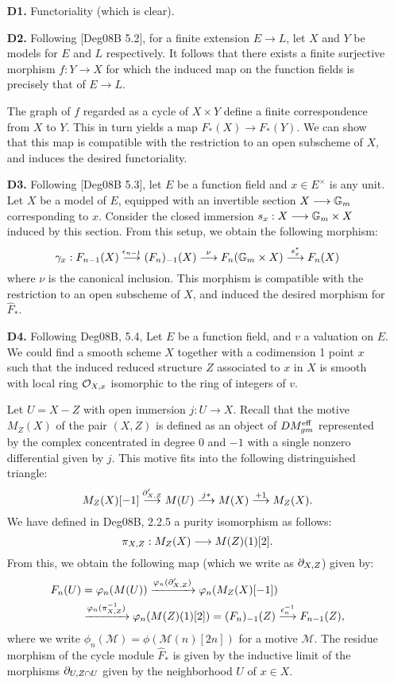 \begin{enumerate}
\item[\textbf{D1.}] Functoriality (which is clear).

\item[\textbf{D2.}] Following [Deg08B 5.2], for a finite extension
$E \to L$, let $X$ and $Y$ be models for $E$ and $L$ respectively.
It follows that there exists a finite surjective morphism $f: Y 
\to X$ for which the induced map on the function fields is 
precisely that of $E \to L$.

The graph of $f$ regarded as a cycle of $X \times Y$ define a 
finite correspondence from $X$ to $Y$. This in turn yields a map 
$F_*(X) \to F_*(Y)$. We can show that this map is compatible with 
the restriction to an open subscheme of $X$, and induces the 
desired functoriality.

\item[\textbf{D3.}] Following [Deg08B 5.3], let $E$ be a function
field and $x \in E^{\times}$ is any unit. Let $X$ be a model of 
$E$, equipped with an invertible section $X \longrightarrow \mathbb{G}_m$ corresponding
to $x$. Consider the closed immersion $s_x: X \longrightarrow \mathbb{G}_m \times X$
induced by this section. From this setup, we obtain the following 
morphism:
\[
\gamma_x: F_{n - 1}(X) \stackrel{\epsilon_{n - 1}}{\longrightarrow} (F_n)_{-1}(X)
\stackrel{\nu}{\longrightarrow} F_n(\mathbb{G}_m \times X) \stackrel{s_x^*}{\longrightarrow} 
F_n(X)
\]
where $\nu$ is the canonical inclusion. This morphism is 
compatible with the restriction to an open subscheme of $X$, and 
induced the desired morphism for $\widehat{F}_*$.

\item[\textbf{D4.}] Following Deg08B, 5.4, Let $E$ be a function 
field, and $v$ a valuation on $E$. We could find a smooth scheme
$X$ together with a codimension 1 point $x$ such that the induced
reduced structure $Z$ associated to $x$ in $X$ is smooth with 
local ring $\mathcal{O}_{X,x}$ isomorphic to the ring of integers of $v$.

Let $U = X - Z$ with open immersion $j: U \to X$. Recall that the
motive $M_Z(X)$ of the pair $(X, Z)$ is defined as an object of
$DM^{\mathrm{eff}}_{gm}$ represented by the complex concentrated in degree 0
and $-1$ with a single nonzero differential given by $j$. This
motive fits into the following distringuished triangle:
\[
M_Z(X)[-1] \stackrel{\partial_{X, Z}'}{\longrightarrow} M(U) \stackrel{j*}{\longrightarrow}
M(X) \stackrel{+1}{\longrightarrow} M_Z(X).
\]
We have defined in Deg08B, 2.2.5 a purity isomorphism as follows:
\[
\pi_{X, Z}: M_Z(X) \longrightarrow M(Z)(1)[2].
\]
From this, we obtain the following map (which we write as 
$\partial_{X, Z}$) given by:
\begin{align*}
F_n(U) &= \varphi_n(M(U)) \xrightarrow{\varphi_n(\partial_{X,Z}')} 
   \varphi_n(M_Z(X)[-1]) \\
   &\xrightarrow{\varphi_n(\pi_{X, Z}^{-1})} \varphi_n(M(Z)(1)[2])
    = (F_n)_{-1}(Z) \stackrel{\epsilon_n^{-1}}{\longrightarrow} F_{n - 1}(Z),
\end{align*}
where we write $\phi_n(\mathcal{M}) = \phi(\mathcal{M}(n)[2n])$
for a motive $\mathcal{M}$. The residue morphism of the cycle
module $\widehat{F}_*$ is given by the inductive limit of the
morphisms $\partial_{U, Z \cap U}$ given by the neighborhood $U$ of
$x \in X$.
\end{enumerate}

